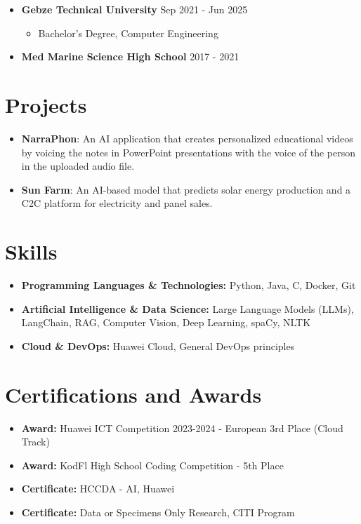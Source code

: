 \begin{itemize}
    \item \textbf{Gebze Technical University} \hfill Sep 2021 - Jun 2025
    \begin{itemize}
        \item Bachelor's Degree, Computer Engineering
    \end{itemize}
    \item \textbf{Med Marine Science High School} \hfill 2017 - 2021
\end{itemize}

\section*{Projects}
\begin{itemize}
    \item \textbf{NarraPhon}: An AI application that creates personalized educational videos by voicing the notes in PowerPoint presentations with the voice of the person in the uploaded audio file.
    \item \textbf{Sun Farm}: An AI-based model that predicts solar energy production and a C2C platform for electricity and panel sales.
\end{itemize}

\section*{Skills}
\begin{itemize}
    \item \textbf{Programming Languages \& Technologies:} Python, Java, C, Docker, Git
    \item \textbf{Artificial Intelligence \& Data Science:} Large Language Models (LLMs), LangChain, RAG, Computer Vision, Deep Learning, spaCy, NLTK
    \item \textbf{Cloud & DevOps:} Huawei Cloud, General DevOps principles
\end{itemize}

\section*{Certifications and Awards}
\begin{itemize}
    \item \textbf{Award:} Huawei ICT Competition 2023-2024 - European 3rd Place (Cloud Track)
    \item \textbf{Award:} KodFl High School Coding Competition - 5th Place
    \item \textbf{Certificate:} HCCDA - AI, Huawei
    \item \textbf{Certificate:} Data or Specimens Only Research, CITI Program
\end{itemize}

\clearpage